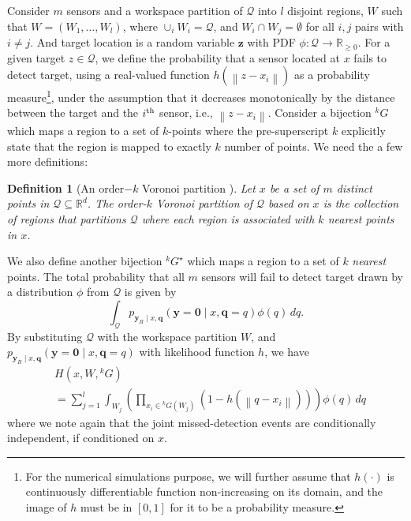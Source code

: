 \documentclass[journal]{IEEEtran}
\newtheorem{definition}{Definition}[section]
\begin{document}
Consider $m$ sensors and a workspace partition of $\mathcal{Q}$ into $l$ disjoint regions, $W$ such that
$W = (W_1,\dots,W_l)$, where $\cup_i W_i = \mathcal{Q}$, and $W_i \cap W_j = \emptyset$ for all $i,j$ pairs with $i \neq j$. And target location is a random variable $\bm{z}$ with PDF $\phi:\mathcal{Q} \rightarrow \mathbb{R}_{\geq 0}$.
For a given target $z \in \mathcal{Q}$, we define the probability that a sensor located at $x$ fails to detect target, using a real-valued function $h(\left\|z - x_i\right\|)$ as a probability measure\footnote{For the numerical simulations purpose, we will further assume that $h(\cdot)$ is continuously differentiable function non-increasing on its domain, and the image of $h$ must be in $[0,1]$ for it to be a probability measure.}, under the assumption that it decreases monotonically by the distance between the target and the $i^{\textup{th}}$ sensor, i.e., $\left\| z- x_i\right\|$. 
Consider a bijection ${}^kG$ which maps a region to a set of $k$-points where the pre-superscript $k$ explicitly state that the region is mapped to exactly $k$ number of points.
We need the a few more definitions:
\begin{definition}[An order$-k$ Voronoi partition \cite{shamos1975closest}]
	Let $x$ be a set of $m$ distinct points in $\mathcal{Q}\subseteq \mathbb{R}^d$. The order-$k$ Voronoi partition of $\mathcal{Q}$ based on $x$ is the collection of regions that partitions $\mathcal{Q}$ where each region is associated with $k$ nearest points in $x$.
	\label{orderk}
\end{definition}
We also define another bijection ${}^kG^{\star}$ which maps a region to a set of $k$ \emph{nearest} points. The total probability that all $m$ sensors will fail to detect target drawn by a distribution $\phi$ from $\mathcal{Q}$ is given by
\[
\int_{\mathcal{Q}} p_{\bm{y}_{B} \mid x,\bm{q}
}\left(\bm{y} = \mathbf{0} \mid x,\bm{q}=q
\right)\phi(q)\,{dq}.
\]
By substituting $\mathcal{Q}$ with the workspace partition $W$, and $p_{\bm{y}_{B} \mid x,\bm{q}
}\left(\bm{y} = \mathbf{0} \mid x,\bm{q}=q
\right)$ with likelihood function $h$, we have
\begin{align}
&H(x,W,{}^kG) \nonumber \\
&= \sum_{j = 1}^l \int_{W_j} \left( \prod_{x_i \in {}^kG(W_j)} \left(1- h \left(\left\|
q - x_i \right\|  \right) \right) \right)\phi(q)\,dq
\label{cost2}
\end{align}
where we note again that the joint missed-detection events are conditionally independent, if conditioned on $x$.
\end{document}
